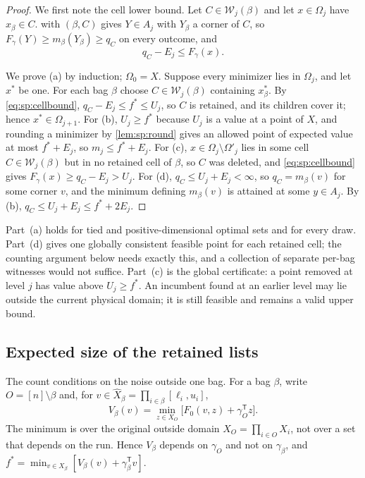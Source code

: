 \begin{proof}
We first note the cell lower bound. Let $C\in\mathcal W_j(\beta)$ and let
$x\in\Omega_j$ have $x_\beta\in C$.  with $(\beta,C)$ gives
$Y\in A_j$ with $Y_\beta$ a corner of $C$, so
$F_\gamma(Y)\ge m_\beta(Y_\beta)\ge q_C$ on every outcome, and
\begin{equation}\label{eq:sp:cellbound}
 q_C-E_j\le F_\gamma(x).
\end{equation}

We prove (a) by induction; $\Omega_0=X$. Suppose every minimizer lies in
$\Omega_j$, and let $x^*$ be one. For each bag $\beta$ choose
$C\in\mathcal W_j(\beta)$ containing $x^*_\beta$. By \eqref{eq:sp:cellbound},
$q_C-E_j\le f^*\le U_j$, so $C$ is retained, and its children cover it; hence
$x^*\in\Omega_{j+1}$. For (b), $U_j\ge f^*$ because $U_j$ is a value at a
point of $X$, and rounding a minimizer by \cref{lem:sp:round} gives an
allowed point of expected value at most $f^*+E_j$, so $m_j\le f^*+E_j$.
For (c), $x\in\Omega_j\setminus\Omega'_j$ lies in some cell
$C\in\mathcal W_j(\beta)$ but in no retained cell of $\beta$, so $C$ was
deleted, and \eqref{eq:sp:cellbound} gives $F_\gamma(x)\ge q_C-E_j>U_j$.
For (d), $q_C\le U_j+E_j<\infty$, so $q_C=m_\beta(v)$ for some corner $v$,
and the minimum defining $m_\beta(v)$ is attained at some $y\in A_j$. By (b),
$q_C\le U_j+E_j\le f^*+2E_j$.
\end{proof}

Part~(a) holds for tied and positive-dimensional optimal sets and for every
draw. Part~(d) gives one globally consistent feasible point for each retained
cell; the counting argument below needs exactly this, and a collection of
separate per-bag witnesses would not suffice. Part~(c) is the global
certificate: a point removed at level $j$ has value above $U_j\ge f^*$.
An incumbent found at an earlier level may lie outside the current physical
domain; it is still feasible and remains a valid upper bound.

\subsection{Expected size of the retained lists}\label{sec:sp:count}

The count conditions on the noise outside one bag. For a bag $\beta$, write
$O=[n]\setminus\beta$ and, for $v\in\widehat X_\beta=\prod_{i\in\beta}[\ell_i,u_i]$,
\begin{equation}\label{eq:sp:V}
 V_\beta(v)=\min_{z\in X_O}\bigl[F_0(v,z)+\gamma_O^{\mathsf T}z\bigr].
\end{equation}
The minimum is over the original outside domain $X_O=\prod_{i\in O}X_i$, not
over a set that depends on the run. Hence $V_\beta$ depends on $\gamma_O$ and
not on $\gamma_\beta$, and $f^*=\min_{v\in X_\beta}[V_\beta(v)+\gamma_\beta^{\mathsf T}v]$.

